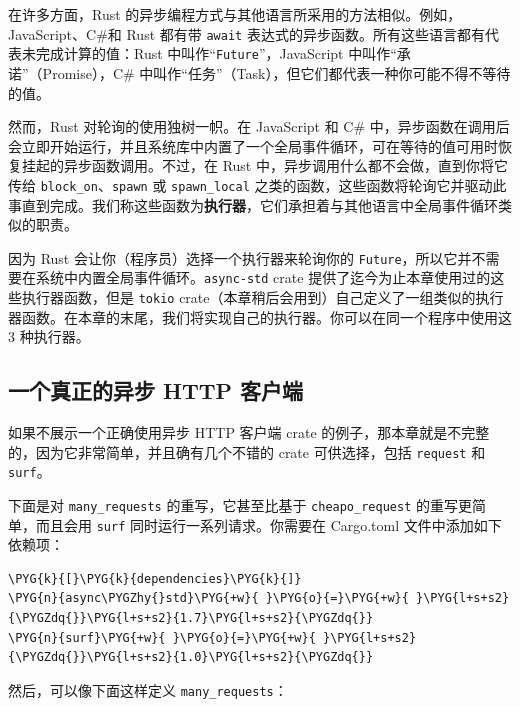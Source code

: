 在许多方面，Rust 的异步编程方式与其他语言所采用的方法相似。例如，JavaScript、C\#和 Rust 都有带 \texttt{await} 表达式的异步函数。所有这些语言都有代表未完成计算的值：Rust 中叫作“\texttt{Future}”，JavaScript 中叫作“承诺”（Promise），C\# 中叫作“任务”（Task），但它们都代表一种你可能不得不等待的值。

然而，Rust 对轮询的使用独树一帜。在 JavaScript 和 C\# 中，异步函数在调用后会立即开始运行，并且系统库中内置了一个全局事件循环，可在等待的值可用时恢复挂起的异步函数调用。不过，在 Rust 中，异步调用什么都不会做，直到你将它传给 \texttt{block\_on}、\texttt{spawn} 或 \texttt{spawn\_local} 之类的函数，这些函数将轮询它并驱动此事直到完成。我们称这些函数为\textbf{执行器}，它们承担着与其他语言中全局事件循环类似的职责。

因为 Rust 会让你（程序员）选择一个执行器来轮询你的 \texttt{Future}，所以它并不需要在系统中内置全局事件循环。\texttt{async-std} crate 提供了迄今为止本章使用过的这些执行器函数，但是 \texttt{tokio} crate（本章稍后会用到）自己定义了一组类似的执行器函数。在本章的末尾，我们将实现自己的执行器。你可以在同一个程序中使用这 3 种执行器。

\subsection{一个真正的异步 HTTP 客户端}

如果不展示一个正确使用异步 HTTP 客户端 crate 的例子，那本章就是不完整的，因为它非常简单，并且确有几个不错的 crate 可供选择，包括 \texttt{request} 和 \texttt{surf}。

下面是对 \texttt{many\_requests} 的重写，它甚至比基于 \texttt{cheapo\_request} 的重写更简单，而且会用 \texttt{surf} 同时运行一系列请求。你需要在 Cargo.toml 文件中添加如下依赖项：

\begin{Verbatim}[commandchars=\\\{\},breaklines=true,breakanywhere=true,fontsize=\codefont,xleftmargin=17bp]
\PYG{k}{[}\PYG{k}{dependencies}\PYG{k}{]}
\PYG{n}{async\PYGZhy{}std}\PYG{+w}{ }\PYG{o}{=}\PYG{+w}{ }\PYG{l+s+s2}{\PYGZdq{}}\PYG{l+s+s2}{1.7}\PYG{l+s+s2}{\PYGZdq{}}
\PYG{n}{surf}\PYG{+w}{ }\PYG{o}{=}\PYG{+w}{ }\PYG{l+s+s2}{\PYGZdq{}}\PYG{l+s+s2}{1.0}\PYG{l+s+s2}{\PYGZdq{}}
\end{Verbatim}

然后，可以像下面这样定义 \texttt{many\_requests}：


